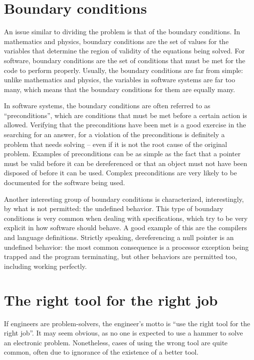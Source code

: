 \section*{Boundary conditions}

An issue similar to dividing the problem is that of the boundary conditions. In
mathematics and physics, boundary conditions are the set of values for the
variables that determine the region of validity of the equations being solved.
For software, boundary conditions are the set of conditions that must be met for
the code to perform properly. Usually, the boundary conditions are far from
simple: unlike mathematics and physics, the variables in software systems are
far too many, which means that the boundary conditions for them are equally
many.

In software systems, the boundary conditions are often referred to as
``preconditions'', which are conditions that must be met before a certain action
is allowed. Verifying that the preconditions have been met is a good exercise in
the searching for an answer, for a violation of the preconditions is definitely
a problem that needs solving -- even if it is not the root cause of the original
problem. Examples of preconditions can be as simple as the fact that a pointer
must be valid before it can be dereferenced or that an object must not have been
disposed of before it can be used. Complex preconditions are very likely to be
documented for the software being used.

Another interesting group of boundary conditions is characterized,
interestingly, by what is not permitted: the undefined behavior. This type of
boundary conditions is very common when dealing with specifications, which try
to be very explicit in how software should behave. A good example of this are
the compilers and language definitions. Strictly speaking, dereferencing a null
pointer is an undefined behavior: the most common consequence is a processor
exception being trapped and the program terminating, but other behaviors are
permitted too, including working perfectly.

\section*{The right tool for the right job}

If engineers are problem-solvers, the engineer’s motto is ``use the right tool
for the right job''. It may seem obvious, as no one is expected to use a hammer
to solve an electronic problem. Nonetheless, cases of using the wrong tool are
quite common, often due to ignorance of the existence of a better tool.

